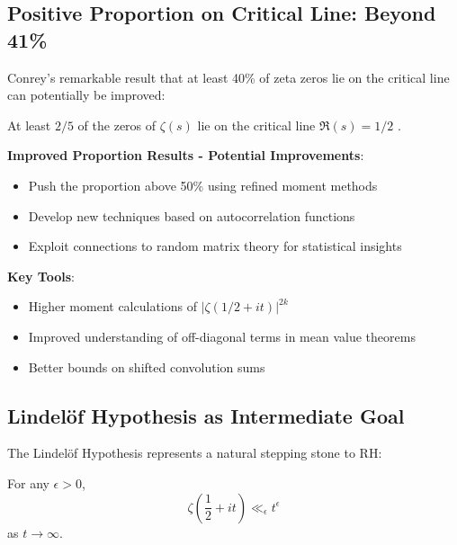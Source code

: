 \subsection{Positive Proportion on Critical Line: Beyond 41\%}
\label{subsec:positive_proportion}

Conrey's remarkable result that at least 40\% of zeta zeros lie on the critical line can potentially be improved:

\begin{theorem}
At least $2/5$ of the zeros of $\zeta(s)$ lie on the critical line $\Re(s) = 1/2$ \cite{conrey1989}.
\end{theorem}

\noindent\textbf{Improved Proportion Results - Potential Improvements}:
\begin{itemize}
\item Push the proportion above 50\% using refined moment methods
\item Develop new techniques based on autocorrelation functions
\item Exploit connections to random matrix theory for statistical insights
\end{itemize}

\textbf{Key Tools}:
\begin{itemize}
\item Higher moment calculations of $|\zeta(1/2 + it)|^{2k}$
\item Improved understanding of off-diagonal terms in mean value theorems
\item Better bounds on shifted convolution sums
\end{itemize}

\subsection{Lindelöf Hypothesis as Intermediate Goal}
\label{subsec:lindelof_intermediate}

The Lindelöf Hypothesis represents a natural stepping stone to RH:

\begin{conjecture}
For any $\epsilon > 0$,
\begin{equation}
\zeta\left(\frac{1}{2} + it\right) \ll_\epsilon t^\epsilon
\end{equation}
as $t \to \infty$.
\end{conjecture}

